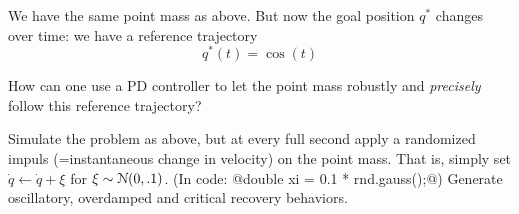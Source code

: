 
We have the same point mass as above. But now the goal position $q^*$
changes over time: we have a reference trajectory
$$q^*(t) = \cos(t)$$

How can one use a PD controller to let the point mass
robustly and \emph{precisely} follow this reference trajectory?

Simulate the problem as above, but at every full second apply a randomized
impuls (=instantaneous change in velocity) on the point mass. That
is, simply set $\dot q \gets \dot q + \xi$ for $\xi\sim{\cal N}(0,.1)$. (In
code: @double xi = 0.1 * rnd.gauss();@) Generate oscillatory,
overdamped and critical recovery behaviors.






\exerfoot
